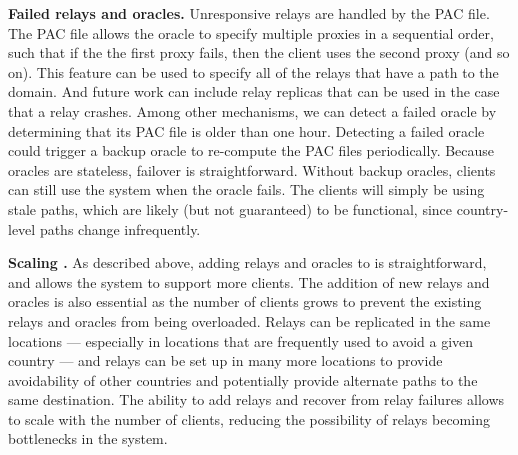 {\bf Failed relays and oracles.} Unresponsive relays are handled
by the PAC file.  The PAC file allows the oracle to specify multiple
proxies in a sequential order, such that if the the first proxy fails,
then the client uses the second proxy (and so on).  This feature can
be used to specify all of the relays that have a path to the domain.
And future work can include relay replicas that can be used in the
case that a relay crashes.  
Among other mechanisms, we can detect a failed oracle by determining
that its PAC file is older than one hour.  Detecting a failed oracle
could trigger a backup oracle to re-compute the PAC files
periodically.  Because oracles are stateless, failover is
straightforward.  Without backup oracles, clients can still use the
system when the oracle fails.  The clients will simply be using stale
paths, which are likely (but not guaranteed) to be functional, since
country-level paths change infrequently.

{\bf Scaling \system{}.}  As described above, adding relays and oracles to \system{} 
is straightforward, and allows the system to support more clients.  The addition of new 
relays and oracles is also essential as the number of clients grows to prevent the existing 
relays and oracles from being overloaded.  Relays can be replicated in the same locations --- 
especially in locations that are frequently used to avoid a given country --- and relays can 
be set up in many more locations to provide avoidability of other countries and potentially provide 
alternate paths to the same destination.  The ability to add relays and recover from relay failures 
allows \system{} to scale with the number of clients, reducing the possibility of relays becoming 
bottlenecks in the system.

